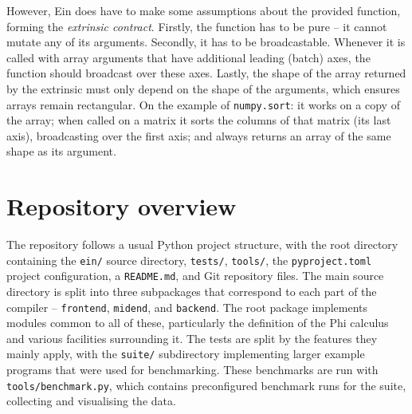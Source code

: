 However, Ein does have to make some assumptions about the provided function, forming the \textit{extrinsic contract}. Firstly, the function has to be pure -- it cannot mutate any of its arguments. Secondly, it has to be broadcastable. Whenever it is called with array arguments that have additional leading (batch) axes, the function should broadcast over these axes. Lastly, the shape of the array returned by the extrinsic must only depend on the shape of the arguments, which ensures arrays remain rectangular. On the example of \texttt{numpy.sort}: it works on a copy of the array; when called on a matrix it sorts the columns of that matrix (its last axis), broadcasting over the first axis; and always returns an array of the same shape as its argument.

\section{Repository overview}
\label{repository-overview}

The repository follows a usual Python project structure, with the root directory containing the \texttt{ein/} source directory, \texttt{tests/}, \texttt{tools/}, the \texttt{pyproject.toml} project configuration, a \texttt{README.md}, and Git repository files. The main source directory is split into three subpackages that correspond to each part of the compiler -- \texttt{frontend}, \texttt{midend}, and \texttt{backend}. The root package implements modules common to all of these, particularly the definition of the Phi calculus and various facilities surrounding it. The tests are split by the features they mainly apply, with the \texttt{suite/} subdirectory implementing larger example programs that were used for benchmarking. These benchmarks are run with \texttt{tools/benchmark.py}, which contains preconfigured benchmark runs for the suite, collecting and visualising the data.

